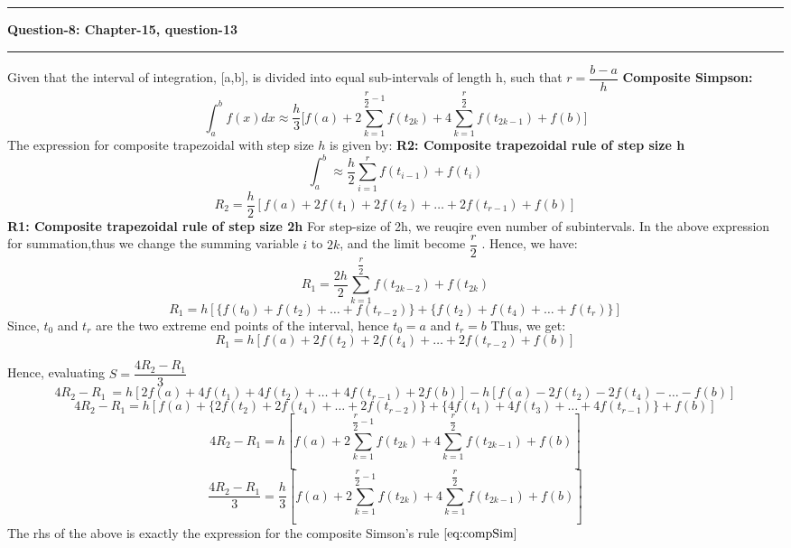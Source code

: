 \documentclass{article}
\newcommand\question[2]{\vspace{.25in}\hrule\textbf{#1: #2}\hrule\vspace{.10in}}
\begin{document}
  \question{Question-8}{Chapter-15, question-13}
  Given that the interval of integration, [a,b], is divided into equal sub-intervals of length h, such that $r = \dfrac{b-a}{h}$
  \textbf {Composite Simpson:}\newline
  \begin{equation}
	  \int_{a}^{b} f(x) dx \approx \dfrac{h}{3}\bigg [ f(a) + 2\sum_{k=1}^{\dfrac{r}{2}-1} f(t_{2k}) + 4\sum_{k=1}^{\dfrac{r}{2}}f(t_{2k-1}) + f(b)\bigg ]
	  \label{eq:compSim}
  \end{equation}
  The expression for composite trapezoidal with step size $h$ is given by: \newline
  \textbf {R2: Composite trapezoidal rule of step size h}
  \[ \int_{a}^{b} \approx \dfrac{h}{2} \sum_{i=1}^{r} f(t_{i-1}) + f(t_i)\]
  \[R_2 = \dfrac{h}{2}[ f(a) + 2f(t_1) + 2f(t_2) + \dots + 2f(t_{r-1}) + f(b) ]\]
  \textbf {R1: Composite trapezoidal rule of step size 2h}
  For step-size of 2h, we reuqire even number of subintervals. In the above expression for summation,thus we change the summing variable $i$ to $2k$, and the limit become $\dfrac{r}{2}$ . Hence, we have:
  \[R_1 = \dfrac{2h}{2}\sum_{k=1}^{\dfrac{r}{2}} f(t_{2k-2}) + f(t_{2k})\]
  \[R_1 = h[ \{f(t_0) + f(t_2) + \dots + f(t_{r-2})\} + \{ f(t_2) + f(t_4) + \dots + f(t_r) \} ]\]
  Since, $t_0$ and $t_r$ are the two extreme end points of the interval, hence $t_0 = a$ and $t_r = b$
  Thus, we get:
  \[R_1 = h[f(a) + 2f(t_2) + 2f(t_4) + \dots + 2f(t_{r-2}) + f(b)]\]

  Hence, evaluating $S = \dfrac{4R_2 - R_1}{3}$
  \[4R_2 - R_1\ = h[2f(a) + 4f(t_1) + 4f(t_2)+\dots+4f(t_{r-1}) + 2f(b)] - h[f(a) - 2f(t_2) - 2f(t_4) - \dots-f(b)]\]
  \[4R_2 - R_1 = h[ f(a) + \{2f(t_2) + 2f(t_4) +\dots+2f(t_{r-2})\} + \{ 4f(t_1)+4f(t_3) + \dots+4f(t_{r-1})\} + f(b) ]\]
  \[4R_2 - R_1 = h[ f(a) + 2\sum_{k=1}^{\dfrac{r}{2}-1}f(t_{2k}) + 4\sum_{k=1}^{\dfrac{r}{2}}f(t_{2k-1}) + f(b)]\]
  \[\dfrac{4R_2 - R_1}{3} = \dfrac{h}{3}[ f(a) + 2\sum_{k=1}^{\dfrac{r}{2}-1}f(t_{2k}) + 4\sum_{k=1}^{\dfrac{r}{2}}f(t_{2k-1}) + f(b)]\]
  The rhs of the above is exactly the expression for the composite Simson's rule $\eqref{eq:compSim}$
\end{document}
